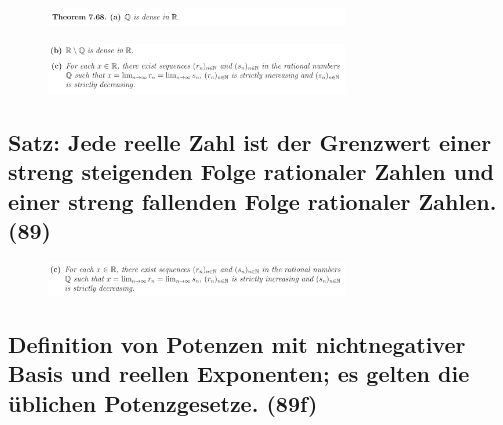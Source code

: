 \begin{figure}[H] \centering
\includegraphics[width=0.7\textwidth]{media/7-23.png}
\end{figure}
\begin{figure}[H] \centering
\includegraphics[width=0.7\textwidth]{media/7-23-2.png}
\end{figure}

\subsection{Satz: Jede reelle Zahl ist der Grenzwert einer streng steigenden Folge rationaler Zahlen und einer streng fallenden Folge rationaler Zahlen. (89)} 

\begin{figure}[H] \centering
\includegraphics[width=0.7\textwidth]{media/7-24.png}
\end{figure}

\subsection{Definition von Potenzen mit nichtnegativer Basis und reellen Exponenten; es gelten die üblichen Potenzgesetze. (89f)}

